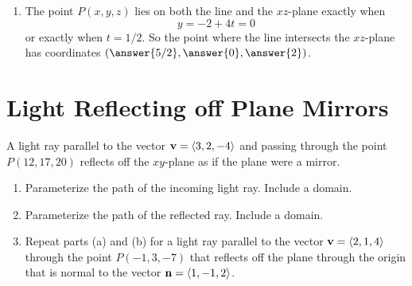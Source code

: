 \documentclass{ximera}
\begin{document}
\begin{example}
\begin{explanation}
\begin{enumerate}
\item The point $P(x,y,z)$ lies on both the line and the $xz$-plane exactly when
\[
     y = -2 + 4t = 0 
\]
or exactly when $t=1/2$. So the point where the line intersects the $xz$-plane has coordinates $(\answer{5/2}, \answer{0}, \answer{2})$.
\end{enumerate} 
\end{explanation}

\end{example} 


\section{Light Reflecting off Plane Mirrors}

\begin{question}  \label{Qdr5577:Lines}
A light ray parallel to the vector ${\bf v} = \langle 3,2,-4 \rangle$ and passing through the point $P(12, 17,20)$ reflects off the $xy$-plane as if the plane were a mirror.

\begin{enumerate}

\item Parameterize the path of the incoming light ray. Include a domain.

\item Parameterize the path of the reflected ray. Include a domain.

\item Repeat parts (a) and (b) for a light ray parallel to the vector ${\bf v} = \langle 2,1,4 \rangle$ through the point $P(-1,3,-7)$ that reflects off the plane through the origin that is normal to the vector ${\bf n} = \langle  1, -1, 2 \rangle$.

\end{enumerate}

\end{question}
\end{document}
